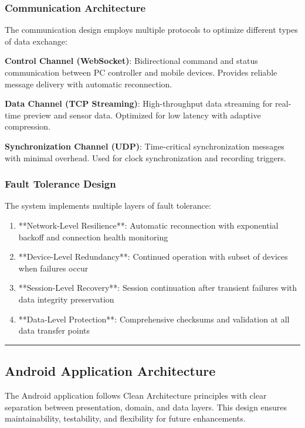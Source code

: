 \documentclass[12pt,a4paper]{report}
\begin{document}
\subsubsection{Communication Architecture}

The communication design employs multiple protocols to optimize different types of data exchange:

\textbf{Control Channel (WebSocket)}: Bidirectional command and status communication between PC controller and mobile devices. Provides reliable message delivery with automatic reconnection.

\textbf{Data Channel (TCP Streaming)}: High-throughput data streaming for real-time preview and sensor data. Optimized for low latency with adaptive compression.

\textbf{Synchronization Channel (UDP)}: Time-critical synchronization messages with minimal overhead. Used for clock synchronization and recording triggers.

\subsubsection{Fault Tolerance Design}

The system implements multiple layers of fault tolerance:

\begin{enumerate}
\item **Network-Level Resilience**: Automatic reconnection with exponential backoff and connection health monitoring
\item **Device-Level Redundancy**: Continued operation with subset of devices when failures occur
\item **Session-Level Recovery**: Session continuation after transient failures with data integrity preservation
\item **Data-Level Protection**: Comprehensive checksums and validation at all data transfer points

\end{enumerate}
\hrule

\subsection{Android Application Architecture}

The Android application follows Clean Architecture principles with clear separation between presentation, domain, and data layers. This design ensures maintainability, testability, and flexibility for future enhancements.
\end{document}
